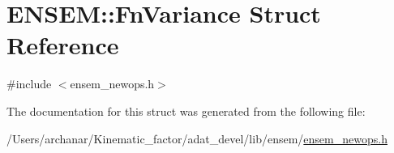 \hypertarget{structENSEM_1_1FnVariance}{}\section{E\+N\+S\+EM\+:\+:Fn\+Variance Struct Reference}
\label{structENSEM_1_1FnVariance}


{\ttfamily \#include $<$ensem\+\_\+newops.\+h$>$}



The documentation for this struct was generated from the following file\+:\begin{DoxyCompactItemize}
\item 
/\+Users/archanar/\+Kinematic\+\_\+factor/adat\+\_\+devel/lib/ensem/\mbox{\hyperlink{lib_2ensem_2ensem__newops_8h}{ensem\+\_\+newops.\+h}}\end{DoxyCompactItemize}
